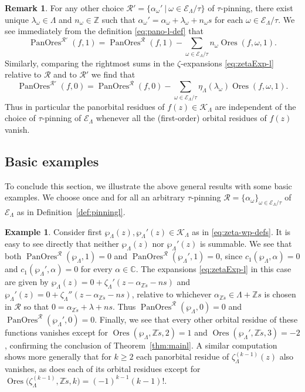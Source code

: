 \documentclass[preprint,12pt]{elsarticle}
\numberwithin{equation}{section} %
\theoremstyle{theorem}
\theoremstyle{definition}
\newtheorem{remark}[theorem]{Remark}
\newtheorem{example}[theorem]{Example}
\newcommand{\bk}{\mathcal{K}} %
\newcommand{\bkl}{\bk_{\Lambda}} %
\newcommand{\ec}{\mathcal{E}} %
\newcommand{\ecl}{\ec_{\Lambda}} %
\newcommand{\orbitl}{{\ecl/\tau}} %
\newcommand{\C}{\mathbb{C}} %
\newcommand{\Z}{\mathbb{Z}} %
\newcommand{\wpl}{\wp_{\Lambda}}
\newcommand{\zl}{\zeta_{\Lambda}}
\DeclareMathOperator{\ores}{Ores}
\DeclareMathOperator{\pano}{PanOres}
\begin{document}
\begin{remark} \label{rem:pano-pinning-l}
    For any other choice $\mathcal{R}'=\{\alpha_\omega' \ | \ \omega\in\orbitl\}$ of $\tau$-pinning, there exist unique $\lambda_\omega\in\Lambda$ and $n_\omega\in\mathbb{Z}$ such that $\alpha_\omega'=\alpha_\omega+\lambda_\omega+n_\omega s$ for each $\omega\in\orbitl$. We see immediately from the definition \eqref{eq:pano-l-def} that \begin{equation}\label{eq:pinning-comparison-l1} \pano^{\mathcal{R}'}(f,1)=\pano^\mathcal{R}(f,1)-\sum_{\omega\in\orbitl}n_\omega\ores(f,\omega,1).\end{equation}
    Similarly, comparing the rightmost sums in the $\zeta$-expansions \eqref{eq:zetaExp-l} relative to $\mathcal{R}$ and to $\mathcal{R}'$ we find that \begin{equation}\label{eq:pinning-comparison-l0} \pano^{\mathcal{R}'}(f,0)=\pano^\mathcal{R}(f,0)- \sum_{\omega\in\orbitl} \eta_\Lambda(\lambda_\omega)\ores(f,\omega,1).\end{equation}
    Thus in particular the panorbital residues of $f(z)\in\bkl$ are independent of the choice of $\tau$-pinning of $\ecl$ whenever all the (first-order) orbital residues of $f(z)$ vanish.
\end{remark}

\subsection{Basic examples}\label{subsec:basic-examples-l}

To conclude this section, we illustrate the above general results with some basic examples. We choose once and for all an arbitrary $\tau$-pinning $\mathcal{R}=\{\alpha_\omega\}_{\omega\in\orbitl}$ of $\ecl$ as in Definition~\ref{def:pinningl}.

\begin{example}\label{ex:wp-l}
    Consider first $\wpl(z),\wpl'(z)\in\bkl$ as in \eqref{eq:zeta-wp-defs}. It is easy to see directly that neither $\wpl(z)$ nor $\wpl'(z)$ is summable. We see that both $\pano^\mathcal{R}(\wpl,1)=0$ and $\pano^\mathcal{R}(\wpl',1)=0$, since $c_1(\wpl,\alpha)=0$ and $c_1(\wpl',\alpha)=0$ for every $\alpha\in\C$. The expansions \eqref{eq:zetaExp-l} in this case are given by $\wpl(z)=0+\zl'(z-\alpha_{\Z \check{s}}-ns)$ and $\wpl'(z)=0+\zl''(z-\alpha_{\Z \check{s}}-ns)$, relative to whichever $\alpha_{\Z \check{s}}\in\Lambda+\Z s$ is chosen in $\mathcal{R}$ so that \mbox{$0=\alpha_{\Z \check{s}}+\lambda+ns$}. Thus $\pano^\mathcal{R}(\wpl,0)=0$ and $\pano^\mathcal{R}(\wpl',0)=0$. Finally, we see that every other orbital residue of these functions vanishes except for $\ores(\wpl,\Z \check{s},2)=1$ and $\ores(\wpl',\Z\check{s},3)=-2$, confirming the conclusion of Theorem~\ref{thm:mainl}. A similar computation shows more generally that for $k\geq 2$ each panorbital residue of $\zl^{(k-1)}(z)$ also vanishes, as does each of its orbital residues except for $\ores\bigl(\zl^{(k-1)},\Z\check{s},k)=(-1)^{k-1}(k-1)!$.\end{example}
\end{document}
